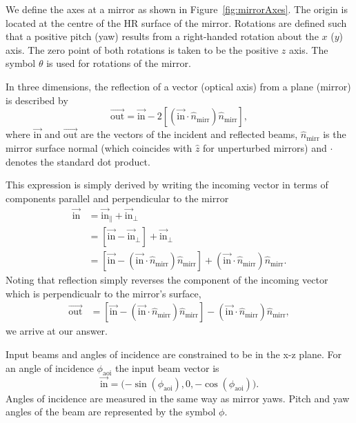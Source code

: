 \documentclass[12pt]{article}
\newcommand{\threeVec}[3]{\big( {#1}, {#2}, {#3} \big)}
\newcommand{\myVec}[1]{\vec{#1}}
\begin{document}
We define the axes at a mirror as shown in
Figure~\ref{fig:mirrorAxes}. The origin is located at the centre of
the HR surface of the mirror. Rotations are defined such that a
positive pitch (yaw) results from a right-handed rotation about the
$x$ ($y$) axis. The zero point of both rotations is taken to be the
positive $z$ axis. The symbol $\theta$ is used for rotations of the
mirror.

In three dimensions, the reflection of a vector (optical axis) from a
plane (mirror) is described by
\begin{equation}
  \label{eq:vectorReflection}
  \myVec{\mathrm{out}} = \myVec{\mathrm{in}}-2\left[(\myVec{\mathrm{in}}\cdot \hat{n}_\mathrm{mirr})\hat{n}_\mathrm{mirr}\right],
\end{equation}
where $\myVec{\mathrm{in}}$ and $\myVec{\mathrm{out}}$ are the vectors
of the incident and reflected beams, $\hat{n}_\mathrm{mirr}$ is the mirror
surface normal (which coincides with $\hat{z}$ for unperturbed
mirrors) and $\cdot$ denotes the standard dot product.

This expression is simply derived by writing the incoming vector in
terms of components parallel and perpendicular to the mirror
\begin{align}
  \myVec{\mathrm{in}}&=\myVec{\mathrm{in}}_\parallel+\myVec{\mathrm{in}}_\perp\\
  &= [\myVec{\mathrm{in}}-\myVec{\mathrm{in}}_\perp]+\myVec{\mathrm{in}}_\perp\\
  &= \left[\myVec{\mathrm{in}}-(\myVec{\mathrm{in}}\cdot \hat{n}_\mathrm{mirr})\hat{n}_\mathrm{mirr}\right]+(\myVec{\mathrm{in}}\cdot \hat{n}_\mathrm{mirr})\hat{n}_\mathrm{mirr}.
\end{align}
Noting that reflection simply reverses the component of the incoming
vector which is perpendicualr to the mirror's surface,
\begin{align}
  \myVec{\mathrm{out}}&= \left[\myVec{\mathrm{in}}-(\myVec{\mathrm{in}}\cdot \hat{n}_\mathrm{mirr})\hat{n}_\mathrm{mirr}\right]-(\myVec{\mathrm{in}}\cdot \hat{n}_\mathrm{mirr})\hat{n}_\mathrm{mirr},
\end{align}
we arrive at our answer.

Input beams and angles of incidence are constrained to be in the x-z
plane. For an angle of incidence $\phi_\mathrm{aoi}$ the input beam vector is
\begin{equation}
  \label{eq:inVec}
  \myVec{\mathrm{in}}=\threeVec{-\sin(\phi_\mathrm{aoi})}{0}{-\cos(\phi_\mathrm{aoi})}.
\end{equation}
Angles of incidence are measured in the same way as mirror yaws. Pitch and yaw angles of the beam are represented by the symbol $\phi$.
\end{document}
